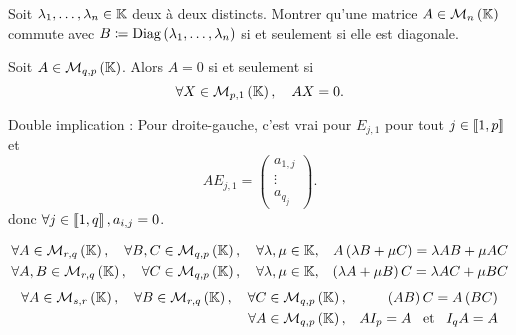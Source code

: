 \documentclass{magnolia}
\begin{document}
\begin{exoUnique}
\exo Soit $\lambda_1,\ldots,\lambda_n\in\mathbb{K}$ deux à deux distincts. Montrer qu'une
matrice $A\in\mathcal{M}_{n}\left(\mathbb{K}\right)$ commute avec
$B\coloneqq\mathop{\rm{Diag}}\left(\lambda_1,\ldots,\lambda_n\right)$ si et seulement si elle est diagonale.
\end{exoUnique}

\begin{proposition}
Soit $A\in\mathcal{M}_{q,p}\left(\mathbb{K}\right)$. Alors $A=0$ si et seulement si
  \[\forall X\in\mathcal{M}_{p,1}\left(\mathbb{K}\right) ,\quad AX=0.\]
\end{proposition}

\begin{preuve}
Double implication : Pour droite-gauche, c'est vrai pour $E_{j,1}$ pour tout $j\in \left\llbracket 1,p\right\rrbracket$ et $$AE_{j,1}=\begin{pmatrix}a_{1,j}\\ \vdots \\ a_{q_j}\end{pmatrix}.$$ donc $\forall j \in \left\llbracket 1,q\right\rrbracket, a_{i,j}=0$.
\end{preuve}


\begin{proposition}[utile=-3]
\begin{eqnarray*}
\forall A\in\mathcal{M}_{r,q}\left(\mathbb{K}\right) ,\quad \forall B,C\in\mathcal{M}_{q,p}\left(\mathbb{K}\right) ,\quad
\forall \lambda,\mu\in\mathbb{K}, & & A\left(\lambda B+\mu C\right)=\lambda AB+\mu AC\\
\forall A,B\in\mathcal{M}_{r,q}\left(\mathbb{K}\right) ,\quad \forall C\in\mathcal{M}_{q,p}\left(\mathbb{K}\right) ,\quad
\forall \lambda,\mu\in\mathbb{K}, & & \left(\lambda A+\mu B\right)C=\lambda AC+\mu BC
\end{eqnarray*}
\begin{eqnarray*}
\forall A\in\mathcal{M}_{s,r}\left(\mathbb{K}\right) ,\quad \forall B\in\mathcal{M}_{r,q}\left(\mathbb{K}\right) ,\quad
\forall C\in\mathcal{M}_{q,p}\left(\mathbb{K}\right), & & \left(AB\right)C=A\left(BC\right)\\
\forall A\in\mathcal{M}_{q,p}\left(\mathbb{K}\right), & & AI_p=A \quad\!\text{et}\quad\! I_qA=A
\end{eqnarray*}
\end{proposition}
\end{document}
